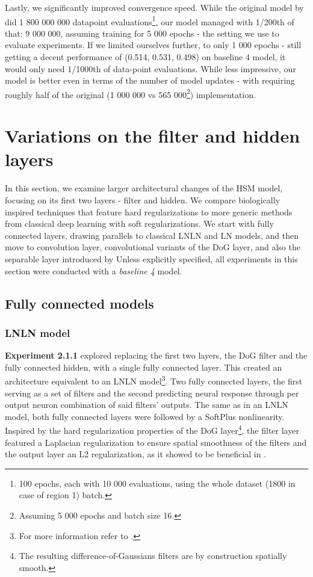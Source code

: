 Lastly, we significantly improved convergence speed. While the original model by \citeauthor{antolik} did 1 800 000 000 datapoint evaluations\footnote{100 epochs, each with 10 000 evaluations, using the whole dataset (1800 in case of region 1) batch.}, our model managed with 1/200th of that: 9 000 000, assuming training for 5 000 epochs - the setting we use to evaluate experiments. If we limited ourselves further, to only 1 000 epochs - still getting a decent performance of (0.514, 0.531, 0.498) on baseline 4 model, it would only need 1/1000th of data-point evaluations. While less impressive, our model is better even in terms of the number of model updates - with requiring roughly half of the original (1 000 000 vs 565 000\footnote{Assuming 5 000 epochs and batch size 16.}) implementation.

\section{Variations on the filter and hidden layers}
In this section, we examine larger architectural changes of the HSM model, focusing on its first two layers - filter and hidden. We compare biologically inspired techniques that feature hard regularizations to more generic methods from classical deep learning with soft regularizations. We start with fully connected layers, drawing parallels to classical LNLN and LN models, and then move to convolution layer, convolutional variants of the DoG layer, and also the separable layer introduced by \cite{klindt} Unless explicitly specified, all experiments in this section were conducted with a \textit{baseline 4} model.

\subsection{Fully connected models}
\subsubsection{LNLN model}\label{ex:2.1.1}

\textbf{Experiment 2.1.1} explored replacing the first two layers, the DoG filter and the fully connected hidden, with a single fully connected layer. This created an architecture equivalent to an LNLN model\footnote{For more information refer to .}. Two fully connected layers, the first serving as a set of filters and the second predicting neural response through per output neuron combination of said filters’ outputs. The same as in an LNLN model, both fully connected layers were followed by a SoftPlus nonlinearity. Inspired by the hard regularization properties of the DoG layer\footnote{The resulting difference-of-Gaussians filters are by construction spatially smooth.}, the filter layer featured a Laplacian regularization to ensure spatial smoothness of the filters and the output layer an L2 regularization, as it showed to be beneficial in .

